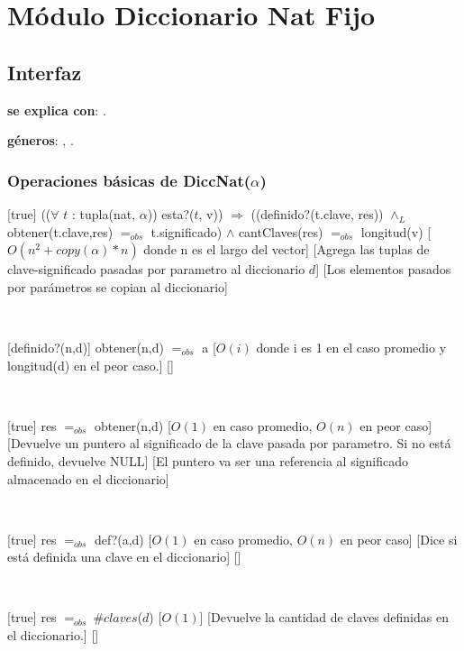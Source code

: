 \section{Módulo Diccionario Nat Fijo}

\subsection{Interfaz}

\textbf{se explica con}: .

\textbf{géneros}: , .

\subsubsection{Operaciones básicas de DiccNat($\alpha$)}

[true]
{(($\forall$ $t$ : tupla(nat, $\alpha$)) esta?($t$, v)) $\Rightarrow$ ((definido?(t.clave, res))
	$\land_L$ obtener(t.clave,res) $=_{obs}$ t.significado) $\land$ cantClaves(res) $=_{obs}$ longitud(v)}
[$O(n^2 + copy(\alpha) * n)$ donde n es el largo del vector]
[Agrega las tuplas de clave-significado pasadas por parametro al diccionario $d$]
[Los elementos pasados por parámetros se copian al diccionario]

~

[definido?(n,d)]
{obtener(n,d) $=_{obs}$ a}
[$O(i)$ donde i es 1 en el caso promedio y longitud(d) en el peor caso.]
[]

~

[true]
{res $=_{obs}$ obtener(n,d)}
[$O(1)$ en caso promedio, $O(n)$ en peor caso]
[Devuelve un puntero al significado de la clave pasada por parametro. Si no está definido, devuelve NULL]
[El puntero va ser una referencia al significado almacenado en el diccionario]

~

[true]
{res $=_{obs}$ def?(a,d)}
[$O(1)$ en caso promedio, $O(n)$ en peor caso]
[Dice si está definida una clave en el diccionario]
[]

~

[true]
{res $=_{obs} \ \# claves$($d$)}
[$O(1)$]
[Devuelve la cantidad de claves definidas en el diccionario.]
[]

